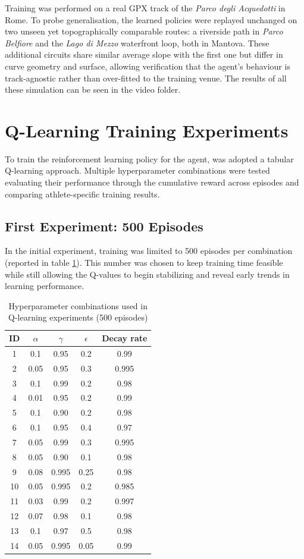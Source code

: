 Training was performed on a real GPX track of the \textit{Parco degli Acquedotti} in Rome. To probe generalisation, the learned policies were replayed unchanged on two unseen yet topographically comparable routes: a riverside path in \textit{Parco Belfiore} and the \textit{Lago di Mezzo} waterfront loop, both in Mantova. These additional circuits share similar average slope with the first one but differ in curve geometry and surface, allowing verification that the agent’s behaviour is track-agnostic rather than over-fitted to the training venue. The results of all these simulation can be seen in the video folder.

\section{Q-Learning Training Experiments}
To train the reinforcement learning policy for the agent, was adopted a tabular Q-learning approach. Multiple hyperparameter combinations were tested evaluating their performance through the cumulative reward across episodes and comparing athlete-specific training results.

\subsection{First Experiment: 500 Episodes}
In the initial experiment, training was limited to 500 episodes per combination (reported in table \ref{tab:hyperparameters-500}). This number was chosen to keep training time feasible while still allowing the Q-values to begin stabilizing and reveal early trends in learning performance.

\begin{table}[H]
\centering
\begin{tabular}{|c|c|c|c|c|}
\hline
\textbf{ID} & $\alpha$ & $\gamma$ & $\epsilon$ & \textbf{Decay rate} \\
\hline
1  & 0.1  & 0.95  & 0.2  & 0.99  \\
2  & 0.05 & 0.95  & 0.3  & 0.995 \\
3  & 0.1  & 0.99  & 0.2  & 0.98  \\
4  & 0.01 & 0.95  & 0.2  & 0.99  \\
5  & 0.1  & 0.90  & 0.2  & 0.98  \\
6  & 0.1  & 0.95  & 0.4  & 0.97  \\
7  & 0.05 & 0.99  & 0.3  & 0.995 \\
8  & 0.05 & 0.90  & 0.1  & 0.98  \\
9  & 0.08 & 0.995 & 0.25 & 0.98  \\
10 & 0.05 & 0.995 & 0.2  & 0.985 \\
11 & 0.03 & 0.99  & 0.2  & 0.997 \\
12 & 0.07 & 0.98  & 0.1  & 0.98  \\
13 & 0.1  & 0.97  & 0.5  & 0.98  \\
14 & 0.05 & 0.995 & 0.05 & 0.99  \\
\hline
\end{tabular}
\label{tab:hyperparameters-500}
\caption{Hyperparameter combinations used in Q-learning experiments (500 episodes)}
\end{table}

